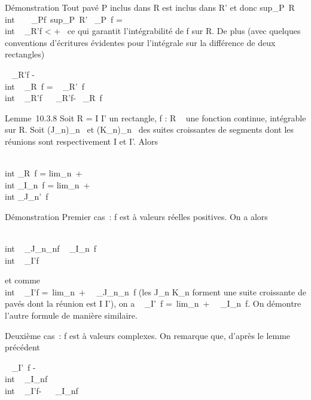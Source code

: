 \documentclass[]{article}
\begin{document}
Démonstration Tout pavé P inclus dans R est inclus dans R' et donc
sup\_P\subset~R\\int ~
\int ~
\_P\textbar{}f\textbar{}\leq\
sup\_P\subset~R'\int ~
\int  \_P~\textbar{}f\textbar{}
=\int  \\int ~
\_R'\textbar{}f\textbar{} \textless{} +\infty~ ce qui garantit
l'intégrabilité de f sur R. De plus (avec quelques conventions
d'écritures évidentes pour l'intégrale sur la différence de deux
rectangles)

\left \textbar{}\int ~
\int  \_R'f -\\int ~
\int  \_R~f\right
\textbar{} = \left \textbar{}\int ~
\int  \_R'\diagdownR~f\right
\textbar{}\leq\int  \\int ~
\_R'\diagdownR\textbar{}f\textbar{}\leq\int ~
\int ~
\_R'\textbar{}f\textbar{}-\int ~
\int  \_R~\textbar{}f\textbar{}

Lemme~10.3.8 Soit R = I \times I' un rectangle, f : R \rightarrow~  une fonction
continue, intégrable sur R. Soit (J\_n)\_n\in{}~ et
(K\_n)\_n\in\mathbb{N}~ des suites croissantes de segments dont les
réunions sont respectivement I et I'. Alors

\int  \\int  \_R~f
= lim\_n\rightarrow~+\infty~~\\int
 \int  \_I\timesK\_n~f
= lim\_n\rightarrow~+\infty~~\\int
 \int  \_J\_n\timesI'~f

Démonstration Premier cas~: f est à valeurs réelles positives. On a
alors

\int  \\int ~
\_J\_n\timesK\_nf \leq\int ~
\int  \_I\timesK\_n~f
\leq\int  \\int ~
\_I\timesI'f

et comme \int  \\int ~
\_I\timesI'f =\
lim\_n\rightarrow~+\infty~\int ~
\int  \_J\_n\timesK\_n~f (les
J\_n \_n forment une suite croissante de pavés dont
la réunion est I \times I'), on a \int ~
\int  \_I\timesI'~f =\
lim\_n\rightarrow~+\infty~\int ~
\int  \_I\timesK\_n~f. On démontre
l'autre formule de manière similaire.

Deuxième cas~: f est à valeurs complexes. On remarque que, d'après le
lemme précédent

\left \textbar{}\int ~
\int  \_I\timesI'~f -\\int
 \int ~
\_I\timesK\_nf\right
\textbar{}\leq\int  \\int ~
\_I\timesI'\textbar{}f\textbar{}-\int ~
\int ~
\_I\timesK\_n\textbar{}f\textbar{}
\end{document}
